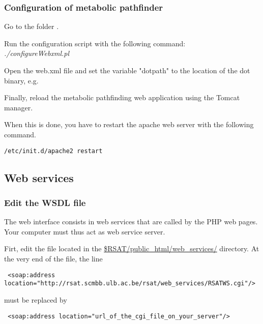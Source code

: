 \documentclass{book}
\begin{document}
\subsubsection{Configuration of metabolic pathfinder}
Go to the folder
.

Run the configuration script with the following command:\\
\textit{./configureWebxml.pl}

Open the web.xml file and set the variable "dotpath" to the location
of the dot binary, e.g. 

Finally, reload the metabolic pathfinding web application using the Tomcat manager.


When this is done, you have to restart the apache web server with the following command.

\begin{footnotesize} 
\begin{verbatim}
/etc/init.d/apache2 restart
\end{verbatim}
\end{footnotesize}


\subsection{Web services}

\subsubsection{Edit the WSDL file}
The web interface consists in web services that are called by the PHP web pages. Your computer must thus act as web service server. 

Firt, edit the file  located in the \url{\$RSAT/public_html/web_services/} directory. At the very end of the file, the line

\begin{footnotesize} 
\begin{verbatim}
 <soap:address location="http://rsat.scmbb.ulb.ac.be/rsat/web_services/RSATWS.cgi"/>
\end{verbatim}
\end{footnotesize}

must be replaced by 

\begin{footnotesize} 
\begin{verbatim}
 <soap:address location="url_of_the_cgi_file_on_your_server"/>
\end{verbatim}
\end{footnotesize}
\end{document}
